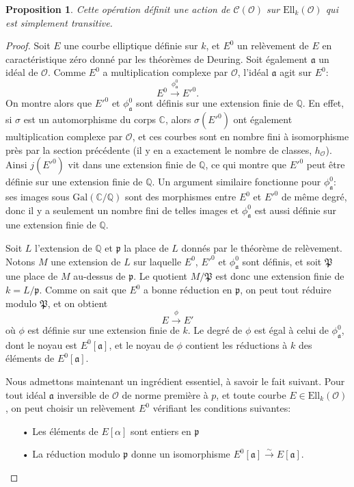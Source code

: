 \documentclass[11pt,a4paper]{article}
\newcommand{\C}{\mathbb{C}}
\newcommand{\Q}{\mathbb{Q}}
\renewcommand{\O}{\mathcal{O}}
\newcommand{\Cl}{\mathcal{C}}
\newcommand{\vers}{\longrightarrow}
\newcommand{\Ell}{\mathrm{Ell}}
\newcommand{\Gal}{\mathrm{Gal}}
\renewcommand{\frak}{\mathfrak}
\newtheorem*{prop}{Proposition}
\theoremstyle{definition}
\begin{document}
\begin{prop}

Cette opération définit une action de $\Cl(\O)$ sur $\Ell_k(\O)$ qui est simplement transitive.

\end{prop}

\begin{proof}

Soit $E$ une courbe elliptique définie sur $k$, et $E^0$ un relèvement de $E$ en caractéristique zéro donné par les théorèmes de Deuring. Soit également $\frak a$ un idéal de $\O$. Comme $E^0$ a multiplication complexe par $\O$, l'idéal $\frak a$ agit sur $E^0$:
$$E^0 \overset{\phi_{\frak a}^0}{\vers} E'^0.$$
On montre alors que $E'^0$ et $\phi_{\frak a}^0$ sont définis sur une extension finie de $\Q$. En effet, si $\sigma$ est un automorphisme du corps $\C$, alors $\sigma(E'^0)$ ont également multiplication complexe par $\O$, et ces courbes sont en nombre fini à isomorphisme près par la section précédente (il y en a exactement le nombre de classes, $h_\O$). Ainsi $j(E'^0)$ vit dans une extension finie de $\Q$, ce qui montre que $E'^0$ peut être définie sur une extension finie de $\Q$. Un argument similaire fonctionne pour $\phi_{\frak a}^0$: ses images sous $\Gal(\C/\Q)$ sont des morphismes entre $E^0$ et $E'^0$ de même degré, donc il y a seulement un nombre fini de telles images et $\phi_{\frak a}^0$ est aussi définie sur une extension finie de $\Q$.

Soit $L$ l'extension de $\Q$ et $\frak p$ la place de $L$ donnés par le théorème de relèvement. Notons $M$ une extension de $L$ sur laquelle $E^0$, $E'^0$ et $\phi_{\frak a}^0$ sont définis, et soit $\frak P$ une place de $M$ au-dessus de $\frak p$. Le quotient $M/\frak P$ est donc une extension finie de $k = L/\frak p$. Comme on sait que $E^0$ a bonne réduction en $\frak p$, on peut tout réduire modulo $\frak P$, et on obtient
$$E \overset{\phi}{\vers} E'$$
où $\phi$ est définie sur une extension finie de $k$. Le degré de $\phi$ est égal à celui de $\phi_{\frak a}^0$, dont le noyau est $E^0[\frak a]$, et le noyau de $\phi$ contient les réductions à $k$ des éléments de $E^0[\frak a]$. 

Nous admettons maintenant un ingrédient essentiel, à savoir le fait suivant. Pour tout idéal $\frak a$ inversible de $\O$ de norme première à $p$, et toute courbe $E\in \Ell_k(\O)$, on peut choisir un relèvement $E^0$ vérifiant les conditions suivantes:
\begin{itemize}
\item[•] Les éléments de $E[\alpha]$ sont entiers en $\frak p$
\item[•] La réduction modulo $\frak p$ donne un isomorphisme $E^0[\frak a] \overset{\sim}{\to} E[\frak a]$.
\end{itemize}


\end{proof}
\end{document}
